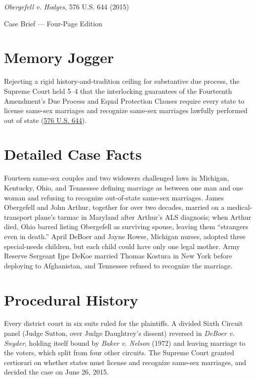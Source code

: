 \documentclass[12pt]{article}
\begin{document}
\begin{center}
{\LARGE \textit{Obergefell v. Hodges}, 576 U.S. 644 (2015)\par}
\vspace{0.8em}
{\large Case Brief --- Four-Page Edition\par}
\end{center}
\vspace{1em}

\section{Memory Jogger}

Rejecting a rigid history-and-tradition ceiling for substantive due process, the Supreme Court held 5--4 that the interlocking guarantees of the Fourteenth Amendment's Due Process and Equal Protection Clauses require every state to license same-sex marriages and recognize same-sex marriages lawfully performed out of state (\href{https://www.courtlistener.com/opinion/2812209/obergefell-v-hodges/}{576 U.S. 644}).

\section{Detailed Case Facts}

Fourteen same-sex couples and two widowers challenged laws in Michigan, Kentucky, Ohio, and Tennessee defining marriage as between one man and one woman and refusing to recognize out-of-state same-sex marriages. James Obergefell and John Arthur, together for over two decades, married on a medical-transport plane's tarmac in Maryland after Arthur's ALS diagnosis; when Arthur died, Ohio barred listing Obergefell as surviving spouse, leaving them ``strangers even in death.'' April DeBoer and Jayne Rowse, Michigan nurses, adopted three special-needs children, but each child could have only one legal mother. Army Reserve Sergeant Ijpe DeKoe married Thomas Kostura in New York before deploying to Afghanistan, and Tennessee refused to recognize the marriage.

\section{Procedural History}

Every district court in six suits ruled for the plaintiffs. A divided Sixth Circuit panel (Judge Sutton, over Judge Daughtrey's dissent) reversed in \textit{DeBoer v. Snyder}, holding itself bound by \textit{Baker v. Nelson} (1972) and leaving marriage to the voters, which split from four other circuits. The Supreme Court granted certiorari on whether states must license and recognize same-sex marriages, and decided the case on June 26, 2015.
\end{document}
